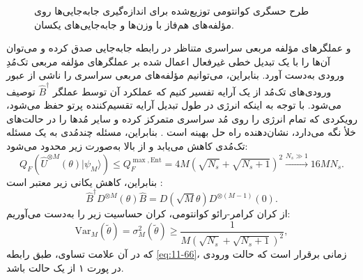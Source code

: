 \begin{figure}[ht]
	\centering
	\caption{طرح حسگری کوانتومی توزیع‌شده برای اندازه‌گیری جابه‌جایی‌ها روی مؤلفه‌های هم‌فاز با وزن‌ها و جابه‌جایی‌های یکسان.}
	\label{fig:11-4}
\end{figure}

و عملگرهای مؤلفه مربعی سراسری متناظر در رابطه جابه‌جایی صدق کرده و می‌توان آن‌ها را با یک تبدیل خطی غیرفعال اعمال شده بر عملگرهای مؤلفه مربعی تک‌مُدِ ورودی به‌دست آورد. بنابراین، می‌توانیم مؤلفه‌های مربعی سراسری را ناشی از عبور ورودی‌های تک‌مُد از یک آرایه  تفسیر کنیم که عملکرد آن توسط عملگر $\hat{B}^\dagger$ توصیف می‌شود. با توجه به اینکه انرژی در طول تبدیل آرایه تقسیم‌کننده پرتو حفظ می‌شود، رویکردی که تمام انرژی را روی مُد سراسری متمرکز کرده و سایر مُدها را در حالت‌های خلأ نگه می‌دارد، نشان‌دهنده راه حل بهینه است \cite{20}. بنابراین، مسئله چندمُدی به یک مسئله تک‌مُدی کاهش می‌یابد و  از بالا به‌صورت زیر محدود می‌شود:
\begin{equation}
	Q_F(\hat{U}^{\otimes M}(\theta) | \psi_M \rangle) \leq Q_F^{\max, \text{Ent}} = 4M(\sqrt{N_s} + \sqrt{N_s + 1})^2 \xrightarrow{N_s \gg 1} 16 M N_s.
	\label{eq:11-65}
\end{equation}
بنابراین، کاهش یکانی زیر معتبر است \cite{20}:
\begin{equation}
	\hat{B}^\dagger D^{\otimes M}(\theta) \hat{B} = D(\sqrt{M}\theta) D^{\otimes (M-1)}(0).
	\label{eq:11-66}
\end{equation}
از کران کرامر-رائو کوانتومی، کران حساسیت زیر را به‌دست می‌آوریم:
\begin{equation}
	\text{Var}_M(\tilde{\theta}) = \sigma_M^2(\tilde{\theta}) \geq \frac{1}{M(\sqrt{N_s} + \sqrt{N_s + 1})^2},
	\label{eq:11-67}
\end{equation}
که در آن علامت تساوی، طبق رابطه \eqref{eq:11-66}، زمانی برقرار است که حالت ورودی در پورت ۱ از  یک حالت  باشد.

